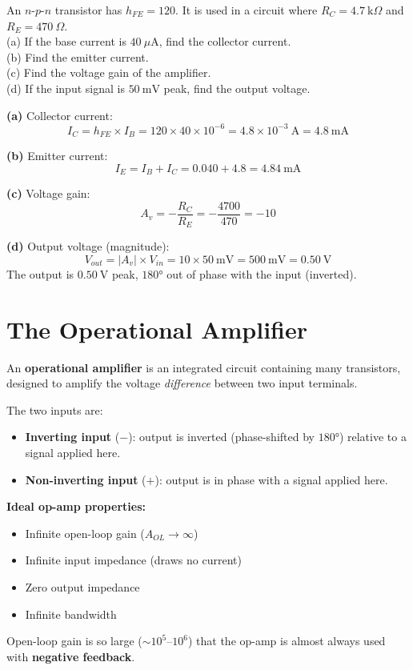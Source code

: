 \begin{examplebox}[29.1]
An $n$-$p$-$n$ transistor has $h_{FE} = 120$.
It is used in a circuit where $R_C = 4.7\ \text{k}\Omega$
and $R_E = 470\ \Omega$.\\
(a) If the base current is $40\ \mu\text{A}$, find
the collector current.\\
(b) Find the emitter current.\\
(c) Find the voltage gain of the amplifier.\\
(d) If the input signal is $50\ \text{mV}$ peak,
find the output voltage.
\end{examplebox}

\begin{solutionbox}
\textbf{(a)} Collector current:
\[
  I_C = h_{FE} \times I_B = 120 \times 40\times10^{-6}
  = 4.8\times10^{-3}\ \text{A} = 4.8\ \text{mA}
\]

\textbf{(b)} Emitter current:
\[
  I_E = I_B + I_C = 0.040 + 4.8 = 4.84\ \text{mA}
\]

\textbf{(c)} Voltage gain:
\[
  A_v = -\frac{R_C}{R_E} = -\frac{4700}{470} = -10
\]

\textbf{(d)} Output voltage (magnitude):
\[
  V_{out} = |A_v| \times V_{in}
  = 10 \times 50\ \text{mV} = 500\ \text{mV}
  = 0.50\ \text{V}
\]
The output is $0.50\ \text{V}$ peak, $180°$ out of
phase with the input (inverted).
\end{solutionbox}

\section{The Operational Amplifier}

\begin{definitionbox}
An \textbf{operational amplifier} is an integrated
circuit containing many transistors, designed to
amplify the voltage \textit{difference} between
two input terminals.

The two inputs are:
\begin{itemize}[noitemsep]
  \item \textbf{Inverting input} ($-$): output
  is inverted (phase-shifted by $180°$) relative
  to a signal applied here.
  \item \textbf{Non-inverting input} ($+$): output
  is in phase with a signal applied here.
\end{itemize}

\textbf{Ideal op-amp properties:}
\begin{itemize}[noitemsep]
  \item Infinite open-loop gain ($A_{OL} \to \infty$)
  \item Infinite input impedance (draws no current)
  \item Zero output impedance
  \item Infinite bandwidth
\end{itemize}
Open-loop gain is so large ($\sim 10^5$--$10^6$)
that the op-amp is almost always used with
\textbf{negative feedback}.
\end{definitionbox}

